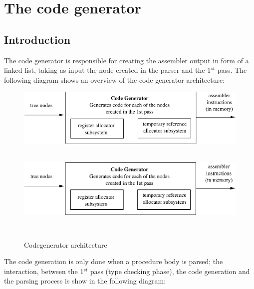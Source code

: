 \documentclass [12pt]{article}
\begin{document}
\section{The code generator}
\label{sec:mylabel7}

\subsection{Introduction}
\label{subsec:introductioneratorer}

The code generator is responsible for creating the assembler output in form 
of a linked list, taking as input the node created in the parser and the 
1$^{st}$ pass. The following diagram shows an overview of the code generator 
architecture:

\begin{figure}
\ifpdf
\includegraphics{arch9.pdf}
\else
\includegraphics[width=5.68in,height=1.76in]{arch9.eps}
\fi
\label{fig9}
\caption{Codegenerator architecture}
\end{figure}

The code generation is only done when a procedure body is parsed; the 
interaction, between the 1$^{st}$ pass (type checking phase), the code 
generation and the parsing process is show in the following diagram:
\end{document}
